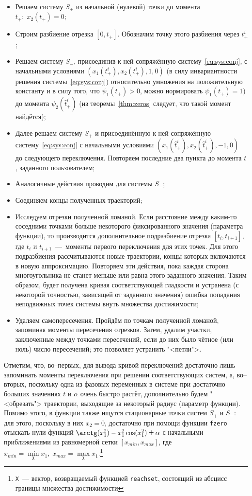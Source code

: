 \documentclass[11pt, oneside, final]{article}
\theoremstyle{break}
\numberwithin{equation}{section}
\theoremstyle{plain}
\theoremstyle{definition}
\begin{document}
    \begin{itemize}
    	\item Решаем систему \( S_+ \) из начальной (нулевой) точки до момента \( t_+:\; x_2(t_+) = 0 \);
    	\item Строим разбиение отрезка \( [0,t_+] \). Обозначим точку этого разбиения через \( t^i_+ \);
    	\item Решаем систему \( S_- \), присоединив к ней сопряжённую систему~\eqref{eq:sys:conj}, с начальными условиями \( (x_1(t^i_+),x_2(t^i_+),1,0) \) (в силу инвариантности решения системы~\eqref{eq:sys:conj}) относительно умножения на положительную константу и в силу того, что \( \psi_1(t_+)>0 \), можно нормировать \( \psi_1(t_+)=1 \)) до момента \( \psi_2(\hat{t}^i_+) \) (из теоремы~\eqref{thm:zeros} следует, что такой момент найдётся);
    	\item Далее решаем систему \( S_+ \) и присоединённую к ней сопряжённую систему~\eqref{eq:sys:conj} с начальными условиями \( (x_1(\hat{t}^i_+),x_2(\hat{t}^i_+),-1,0) \) до следующего переключения. Повторяем последние два пункта до момента \( t \), заданного пользователем;
    	\item Аналогичные действия проводим для системы \( S_- \);
    	\item Соединяем концы полученных траекторий;
	    \item Исследуем отрезки полученной ломаной. Если расстояние между каким-то соседними точками больше некоторого фиксированного значения (параметра функции), то производится дополнительное подразбиение отрезка \( [t_{i},t_{i+1}] \), где \( t_{i} \) и \( t_{i+1} \)~---~моменты первого переключения для этих точек. Для этого подразбиения рассчитываются новые траектории, концы которых включаются в новую аппроксимацию. Повторяем эти действия, пока каждая сторона многоугольника не станет меньше или равна этого заданного значения. Таким образом, будет получена кривая соответствующей гладкости и устранена (с некоторой точностью, зависящей от заданного значения) ошибка попадания неподвижных точек системы внуть множества достижимости;
    	\item Удаляем самопересечения. Пройдём по точкам полученной ломаной, запоминая моменты пересечения отрезков. Затем, удалим участки, заключенные между точками пересечений, если до них было чётное (или ноль) число пересечений; это позволяет устранить "<петли">.
    \end{itemize}
    Отметим, что, во--первых, для вывода кривой переключений достаточно лишь запоминать моменты переключения при решении соответствующих систем, а, во--вторых, поскольку одна из фазовых переменных в системе при достаточно больших значениях \(t\) и \(\alpha\) очень быстро растёт, дополнительно будем "<обрезать"> траектории, выходящие за некоторый радиус (параметр функции). Помимо этого, в функции также ищутся стационарные точки систем \(S_+\) и \(S_-\): для этого, поскольку в них \(x_2 = 0\), достаточно при помощи функции \texttt{fzero} отыскать нули функций \(\arctg(x_1^2)  - x_1^2\cos(x_1^2) \pm \alpha\) с начальными приближениями из равномерной сетки \([x_{min}, x_{max}]\), где \(x_{min} = \min\limits_{\mathtt{X}}x_1,\; x_{max} = \max\limits_{\mathtt{X}}x_1\).\footnote{\texttt{X}~--- вектор, возвращаемый функцией \texttt{reachset}, состоящий из абсцисс границы множества достижимости} 
    \pagebreak
\end{document}

